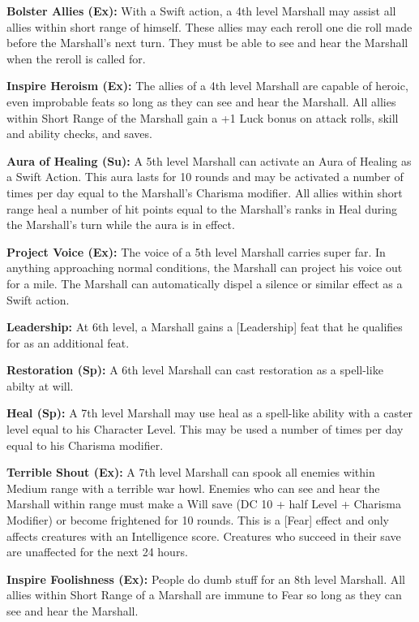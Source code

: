 \textbf{Bolster Allies (Ex):} With a Swift action, a 4th level Marshall may assist all allies within short range of himself. These allies may each reroll one die roll made before the Marshall's next turn. They must be able to see and hear the Marshall when the reroll is called for.

\textbf{Inspire Heroism (Ex):} The allies of a 4th level Marshall are capable of heroic, even improbable feats so long as they can see and hear the Marshall. All allies within Short Range of the Marshall gain a +1 Luck bonus on attack rolls, skill and ability checks, and saves.

\textbf{Aura of Healing (Su):} A 5th level Marshall can activate an Aura of Healing as a Swift Action. This aura lasts for 10 rounds and may be activated a number of times per day equal to the Marshall's Charisma modifier. All allies within short range heal a number of hit points equal to the Marshall's ranks in Heal during the Marshall's turn while the aura is in effect. 

\textbf{Project Voice (Ex):} The voice of a 5th level Marshall carries super far. In anything approaching normal conditions, the Marshall can project his voice out for a mile. The Marshall can automatically dispel a silence or similar effect as a Swift action.

\textbf{Leadership:} At 6th level, a Marshall gains a [Leadership] feat that he qualifies for as an additional feat.

\textbf{Restoration (Sp):} A 6th level Marshall can cast restoration as a spell-like abilty at will.

\textbf{Heal (Sp):} A 7th level Marshall may use heal as a spell-like ability with a caster level equal to his Character Level. This may be used a number of times per day equal to his Charisma modifier.

\textbf{Terrible Shout (Ex):} A 7th level Marshall can spook all enemies within Medium range with a terrible war howl. Enemies who can see and hear the Marshall within range must make a Will save (DC 10 + half Level + Charisma Modifier) or become frightened for 10 rounds. This is a [Fear] effect and only affects creatures with an Intelligence score. Creatures who succeed in their save are unaffected for the next 24 hours.

\textbf{Inspire Foolishness (Ex):} People do dumb stuff for an 8th level Marshall. All allies within Short Range of a Marshall are immune to Fear so long as they can see and hear the Marshall.

